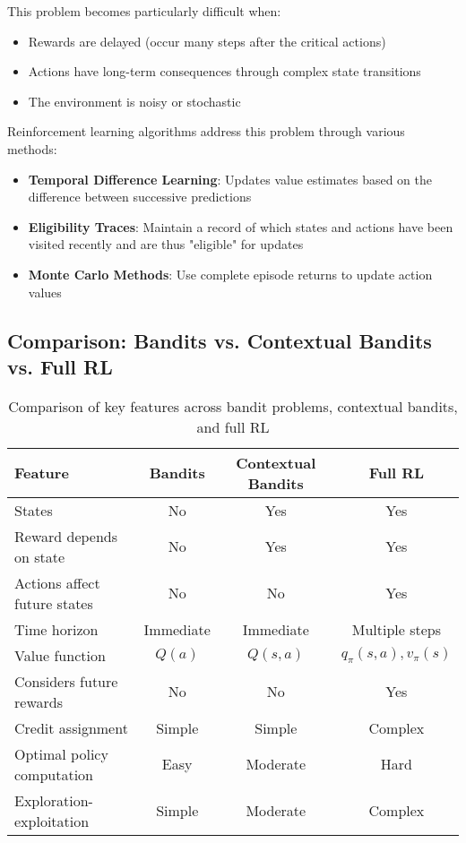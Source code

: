 \documentclass[12pt,a4paper]{article}
\begin{document}
This problem becomes particularly difficult when:
\begin{itemize}
    \item Rewards are delayed (occur many steps after the critical actions)
    \item Actions have long-term consequences through complex state transitions
    \item The environment is noisy or stochastic
\end{itemize}

Reinforcement learning algorithms address this problem through various methods:
\begin{itemize}
    \item \textbf{Temporal Difference Learning}: Updates value estimates based on the difference between successive predictions
    \item \textbf{Eligibility Traces}: Maintain a record of which states and actions have been visited recently and are thus "eligible" for updates
    \item \textbf{Monte Carlo Methods}: Use complete episode returns to update action values
\end{itemize}

\subsection{Comparison: Bandits vs. Contextual Bandits vs. Full RL}

\begin{table}[H]
\centering
\begin{tabular}{|l|c|c|c|}
\hline
\textbf{Feature} & \textbf{Bandits} & \textbf{Contextual Bandits} & \textbf{Full RL} \\
\hline
States & No & Yes & Yes \\
\hline
Reward depends on state & No & Yes & Yes \\
\hline
Actions affect future states & No & No & Yes \\
\hline
Time horizon & Immediate & Immediate & Multiple steps \\
\hline
Value function & $Q(a)$ & $Q(s,a)$ & $q_{\pi}(s,a), v_{\pi}(s)$ \\
\hline
Considers future rewards & No & No & Yes \\
\hline
Credit assignment & Simple & Simple & Complex \\
\hline
Optimal policy computation & Easy & Moderate & Hard \\
\hline
Exploration-exploitation & Simple & Moderate & Complex \\
\hline
\end{tabular}
\caption{Comparison of key features across bandit problems, contextual bandits, and full RL}
\end{table}
\end{document}
